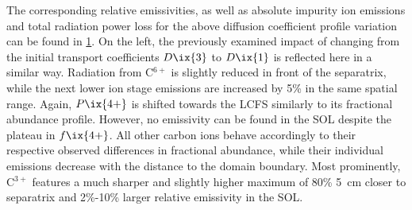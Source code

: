 %
                \begin{figure}[t]%
                    \centering%
                    \begin{minipage}[b]{0.48\textwidth}%
                        \centering%
                    \end{minipage}%
                    \hfill%
                    \begin{minipage}[b]{0.48\textwidth}%
                        \centering%
                    \end{minipage}%
                    \label{fig:rad_ratios_total_103_104}%
                \end{figure}%
%
                The corresponding relative emissivities, as well as absolute impurity ion emissions and total radiation power loss for the above diffusion coefficient profile variation can be found in \cref{fig:rad_ratios_total_103_104}. On the left, the previously examined impact of changing from the initial transport coefficients $D\ix{3}$ to $D\ix{1}$ is reflected here in a similar way. Radiation from C$^{6+}$ is slightly reduced in front of the separatrix, while the next lower ion stage emissions are increased by 5\% in the same spatial range. Again, $P\ix{4+}$ is shifted towards the LCFS similarly to its fractional abundance profile. However, no emissivity can be found in the SOL despite the plateau in $f\ix{4+}$. All other carbon ions behave accordingly to their respective observed differences in fractional abundance, while their individual emissions decrease with the distance to the domain boundary. Most prominently, C$^{3+}$ features a much sharper and slightly higher maximum of 80\% \SI{5}{\centi\meter} closer to separatrix and 2\%-10\% larger relative emissivity in the SOL.\\%
